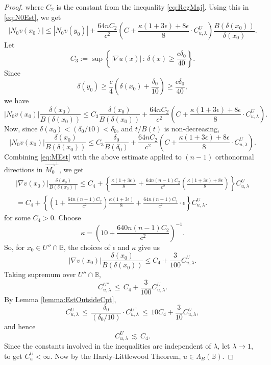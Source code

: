 \documentclass[12pt,a4paper]{amsart}
\numberwithin{equation}{section}
\theoremstyle{definition}
\begin{document}
\begin{proof}
where $C_2$ is the constant from the inequality \eqref{eq:RegMaj}. Using this in \eqref{eq:N0Est}, we get
\[{\left\lvert{N_0v(x_0)}\right\rvert} \le {\left\lvert{N_0v(y_0)}\right\rvert} + \frac{64nC_2}{c^2}\left(C + \frac{\kappa(1+3\epsilon)+8\epsilon}{8}\cdot C_{u,\lambda}^U\right)\frac{B\left(\delta(x_0)\right)}{\delta(x_0)}.\]
Let 
\[C_3 := \sup\left\{ {\left\lvert{\nabla u (x)}\right\rvert} \, :\, \delta(x) \ge \frac{c\delta_0}{40}\right\}.\]
Since 
\[\delta(y_0) \ge \frac{c}{4}\left(\delta(x_0)+\frac{\delta_0}{10}\right) \ge \frac{c\delta_0}{40},\]
we have
\[{\left\lvert{N_0v(x_0)}\right\rvert}\frac{\delta(x_0)}{B\left(\delta(x_0)\right)} \le C_3\frac{\delta(x_0)}{B\left(\delta(x_0)\right)}  + \frac{64nC_2}{c^2}\left(C + \frac{\kappa(1+3\epsilon)+8\epsilon}{8}\cdot C_{u,\lambda}^U\right).\]
Now, since $\delta(x_0) < (\delta_0/10) < \delta_0$, and $t/B(t)$ is non-decreasing,
\[{\left\lvert{N_0v(x_0)}\right\rvert}\frac{\delta(x_0)}{B\left(\delta(x_0)\right)} \le C_3\frac{\delta_0}{B\left(\delta_0\right)}  + \frac{64nC_2}{c^2}\left(C + \frac{\kappa(1+3\epsilon)+8\epsilon}{8}\cdot C_{u,\lambda}^U\right).\]
Combining \eqref{eq:MEst} with the above estimate applied to $(n-1)$ orthonormal directions in $\vec{M_0}^\perp$, we get
\begin{multline*}
{\left\lvert{\nabla v(x_0)}\right\rvert}\frac{\delta(x_0)}{B\left(\delta(x_0)\right)} \le C_4+ \left\{ \frac{\kappa(1+3\epsilon)}{8} + \frac{64n(n-1)C_2}{c^2}\left(\frac{\kappa(1+3\epsilon)+8\epsilon}{8}\right)\right\} C_{u,\lambda}^U\\
= C_4 + \left\{\left(1+\frac{64n(n-1)C_2}{c^2}\right)\frac{\kappa(1+3\epsilon)}{8} + \frac{64n(n-1)C_2}{c^2}\cdot \epsilon \right\}C_{u,\lambda}^U.
\end{multline*}
for some $C_4>0$. Choose 
\[\kappa = \left(10+\frac{640n(n-1)C_2}{c^2}\right)^{-1}.\]
So, for $x_0\in U''\cap\mathbb{B}$, the choices of $\epsilon$ and $\kappa$ give us
\[{\left\lvert{\nabla v(x_0)}\right\rvert}\frac{\delta(x_0)}{B\left(\delta(x_0)\right)} \le C_4 + \frac{3}{100} C_{u,\lambda}^U.\]
Taking supremum over $U''\cap\mathbb{B}$,
\[C_{u,\lambda}^{U''} \, \le\,  C_4 + \frac{3}{100} C_{u,\lambda}^U.\]
By Lemma \ref{lemma:EstOutsideCpt},
\[C_{u,\lambda}^{U} \,\le\, \frac{\delta_0}{(\delta_0/10)}\cdot C_{u,\lambda}^{U''} \,\le\, 10C_4 + \frac{3}{10}C_{u,\lambda}^U,\]
and hence
\[C_{u,\lambda}^{U} \,\lesssim\, C_4.\]
Since the constants involved in the inequalities are independent of $\lambda$, let $\lambda \to 1$, to get $C_u^U < \infty$. Now by the Hardy-Littlewood Theorem, $u\in\Lambda_B(\mathbb{B})$.
\end{proof}
\end{document}
